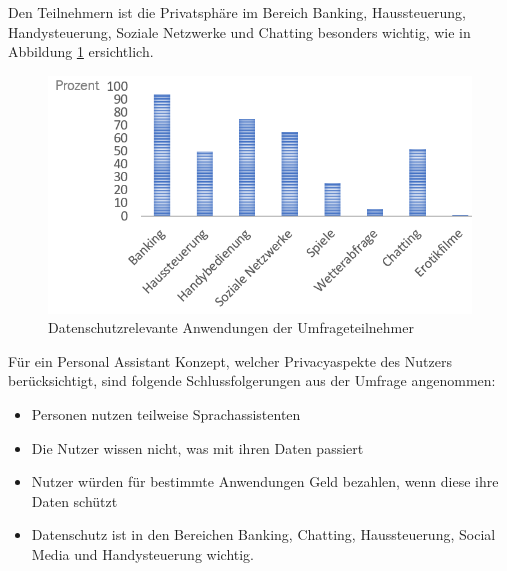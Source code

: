 Den Teilnehmern ist die Privatsphäre im Bereich Banking, Haussteuerung, Handysteuerung, Soziale Netzwerke und Chatting besonders wichtig, wie in Abbildung \ref{fig:umfrage_anwendung} ersichtlich. 


\begin{figure}[h!]
	\centering
	\includegraphics[width=0.7\linewidth]{Picture/umfrage_anwendung}
	\caption[Datenschutzrelevante Anwendungen der Umfrageteilnehmers]{Datenschutzrelevante Anwendungen der Umfrageteilnehmer}
	\label{fig:umfrage_anwendung}
\end{figure}

Für ein Personal Assistant Konzept, welcher Privacyaspekte des Nutzers berücksichtigt, sind folgende Schlussfolgerungen aus der Umfrage angenommen:
\begin{itemize}	
	\item Personen nutzen teilweise Sprachassistenten
	\item Die Nutzer wissen nicht, was mit ihren Daten passiert
	\item Nutzer würden für bestimmte Anwendungen Geld bezahlen, wenn diese ihre Daten schützt
	\item Datenschutz ist in den Bereichen Banking, Chatting, Haussteuerung, Social Media und Handysteuerung wichtig.
\end{itemize}

